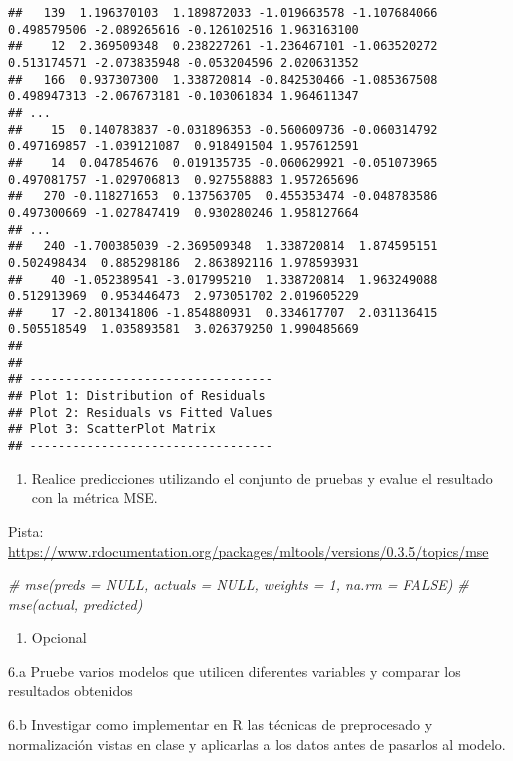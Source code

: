 \documentclass[]{article}
\newenvironment{Shaded}{\begin{snugshade}}{\end{snugshade}}
\newcommand{\CommentTok}[1]{\textcolor[rgb]{0.56,0.35,0.01}{\textit{{#1}}}}
\providecommand{\tightlist}{%
  \setlength{\itemsep}{0pt}\setlength{\parskip}{0pt}}
\begin{document}
\begin{verbatim}
##   139  1.196370103  1.189872033 -1.019663578 -1.107684066 0.498579506 -2.089265616 -0.126102516 1.963163100 
##    12  2.369509348  0.238227261 -1.236467101 -1.063520272 0.513174571 -2.073835948 -0.053204596 2.020631352 
##   166  0.937307300  1.338720814 -0.842530466 -1.085367508 0.498947313 -2.067673181 -0.103061834 1.964611347 
## ... 
##    15  0.140783837 -0.031896353 -0.560609736 -0.060314792 0.497169857 -1.039121087  0.918491504 1.957612591 
##    14  0.047854676  0.019135735 -0.060629921 -0.051073965 0.497081757 -1.029706813  0.927558883 1.957265696 
##   270 -0.118271653  0.137563705  0.455353474 -0.048783586 0.497300669 -1.027847419  0.930280246 1.958127664 
## ... 
##   240 -1.700385039 -2.369509348  1.338720814  1.874595151 0.502498434  0.885298186  2.863892116 1.978593931 
##    40 -1.052389541 -3.017995210  1.338720814  1.963249088 0.512913969  0.953446473  2.973051702 2.019605229 
##    17 -2.801341806 -1.854880931  0.334617707  2.031136415 0.505518549  1.035893581  3.026379250 1.990485669 
## 
## 
## ---------------------------------- 
## Plot 1: Distribution of Residuals 
## Plot 2: Residuals vs Fitted Values 
## Plot 3: ScatterPlot Matrix 
## ----------------------------------
\end{verbatim}

\begin{enumerate}
\def\labelenumi{\arabic{enumi}.}
\setcounter{enumi}{4}
\tightlist
\item
  Realice predicciones utilizando el conjunto de pruebas y evalue el
  resultado con la métrica MSE.
\end{enumerate}

Pista:
\url{https://www.rdocumentation.org/packages/mltools/versions/0.3.5/topics/mse}

\begin{Shaded}
\begin{Highlighting}[]
\CommentTok{# mse(preds = NULL, actuals = NULL, weights = 1, na.rm = FALSE)}
\CommentTok{# mse(actual, predicted)}
\end{Highlighting}
\end{Shaded}

\begin{enumerate}
\def\labelenumi{\arabic{enumi}.}
\setcounter{enumi}{5}
\tightlist
\item
  Opcional
\end{enumerate}

6.a Pruebe varios modelos que utilicen diferentes variables y comparar
los resultados obtenidos

6.b Investigar como implementar en R las técnicas de preprocesado y
normalización vistas en clase y aplicarlas a los datos antes de pasarlos
al modelo.
\end{document}
